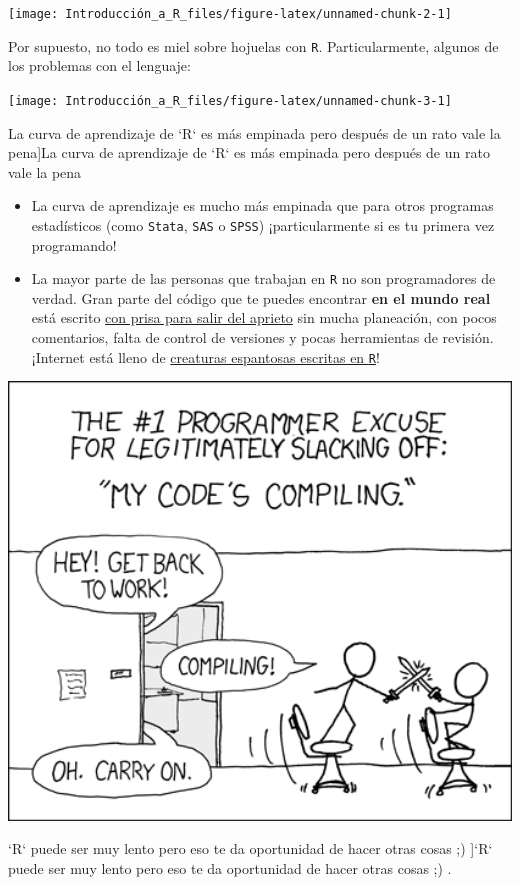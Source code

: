 \documentclass[]{tufte-book}
\begin{document}
\texttt{[image: Introducción\_a\_R\_files/figure-latex/unnamed-chunk-2-1]}

Por supuesto, no todo es miel sobre hojuelas con \texttt{R}.
Particularmente, algunos de los problemas con el lenguaje:

\begin{marginfigure}
\texttt{[image: Introducción\_a\_R\_files/figure-latex/unnamed-chunk-3-1]} \caption[La curva de aprendizaje de `R` es más empinada pero después de un rato vale la pena]{La curva de aprendizaje de `R` es más empinada pero después de un rato vale la pena}\label{fig:unnamed-chunk-3}
\end{marginfigure}

\begin{itemize}
\item
  La curva de aprendizaje es mucho más empinada que para otros programas
  estadísticos (como \texttt{Stata}, \texttt{SAS} o \texttt{SPSS})
  ¡particularmente si es tu primera vez programando!
\item
  La mayor parte de las personas que trabajan en \texttt{R} no son
  programadores de verdad. Gran parte del código que te puedes encontrar
  \textbf{en el mundo real} está escrito
  \href{https://nsaunders.wordpress.com/2014/05/14/this-is-why-code-written-by-scientists-gets-ugly/}{con
  prisa para salir del aprieto} sin mucha planeación, con pocos
  comentarios, falta de control de versiones y pocas herramientas de
  revisión. ¡Internet está lleno de
  \href{https://codegolf.stackexchange.com/a/4011}{creaturas espantosas
  escritas en \texttt{R}}!
\end{itemize}

\begin{marginfigure}
\includegraphics[width=5.74in]{images/compiling} \caption[`R` puede ser muy lento pero eso te da oportunidad de hacer otras cosas ;) ]{`R` puede ser muy lento pero eso te da oportunidad de hacer otras cosas ;) .}\label{fig:unnamed-chunk-4}
\end{marginfigure}
\end{document}
